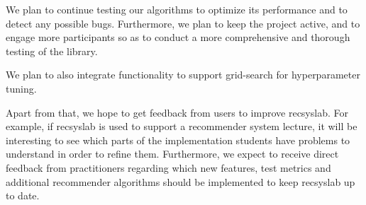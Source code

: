 We plan to continue testing our algorithms to optimize its performance and to detect any possible bugs. Furthermore, we plan to keep the project active, and to engage more participants so as to conduct a more comprehensive and thorough testing of the library.

We plan to also integrate functionality to support grid-search for hyperparameter tuning.

Apart from that, we hope to get feedback from users to improve recsyslab.
For example, if recsyslab is used to support a recommender system lecture, it will be interesting to see which parts of the implementation students have problems to 
understand in order to refine them. Furthermore, we expect to receive direct feedback from practitioners regarding which new features, test metrics and additional recommender algorithms should be implemented to keep recsyslab up to date.
